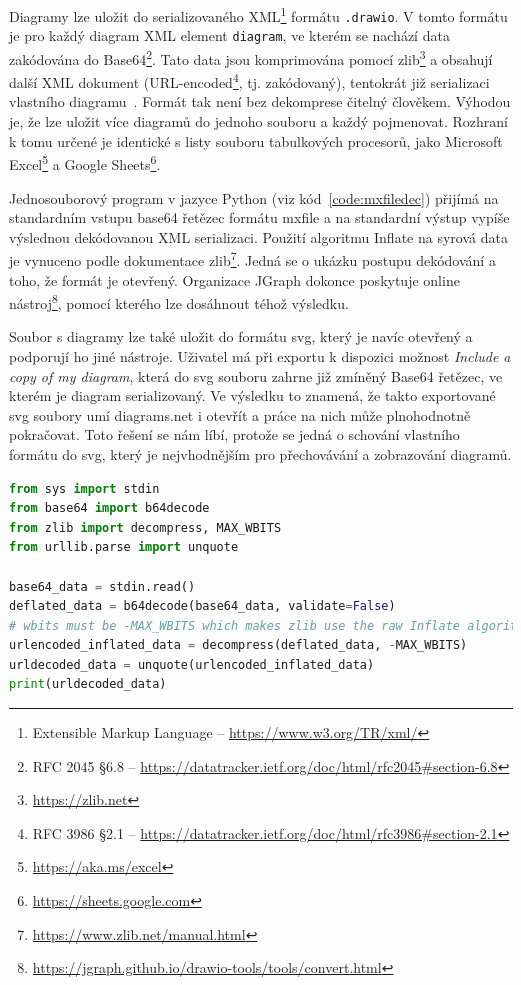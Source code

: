 Diagramy lze uložit do serializovaného XML\footnote{Extensible Markup Language -- \url{https://www.w3.org/TR/xml/}} formátu \texttt{.drawio}.
V tomto formátu je pro každý diagram XML element \texttt{diagram}, ve kterém se nachází data zakódována do Base64\footnote{RFC 2045 \S6.8 -- \url{https://datatracker.ietf.org/doc/html/rfc2045\#section-6.8}}.
Tato data jsou komprimována pomocí zlib\footnote{\url{https://zlib.net}} a obsahují další XML dokument (URL-encoded\footnote{RFC 3986 \S2.1 -- \url{https://datatracker.ietf.org/doc/html/rfc3986\#section-2.1}}, tj. zakódovaný), tentokrát již serializaci vlastního diagramu~\cite{seibert_extractingxml_2016}.
Formát tak není bez dekomprese čitelný člověkem.
Výhodou je, že lze uložit více diagramů do jednoho souboru a každý pojmenovat.
Rozhraní k tomu určené je identické s listy souboru tabulkových procesorů, jako Microsoft Excel\footnote{\url{https://aka.ms/excel}} a Google Sheets\footnote{\url{https://sheets.google.com}}.

Jednosouborový program v jazyce Python (viz kód~\ref{code:mxfiledec}) přijímá na standardním vstupu base64 řetězec formátu mxfile a na standardní výstup vypíše výslednou dekódovanou XML serializaci.
Použití algoritmu Inflate na syrová data je vynuceno podle dokumentace zlib\footnote{\url{https://www.zlib.net/manual.html}}.
Jedná se o ukázku postupu dekódování a toho, že formát je otevřený.
Organizace JGraph dokonce poskytuje online nástroj\footnote{\url{https://jgraph.github.io/drawio-tools/tools/convert.html}}, pomocí kterého lze dosáhnout téhož výsledku.

Soubor s diagramy lze také uložit do formátu \acrshort{svg}, který je navíc otevřený a podporují ho jiné nástroje.
Uživatel má při exportu k dispozici možnost \textit{Include a copy of my diagram}, která do \acrshort{svg} souboru zahrne již zmíněný Base64 řetězec, ve kterém je diagram serializovaný.
Ve výsledku to znamená, že takto exportované \acrshort{svg} soubory umí diagrams.net i otevřít a práce na nich může plnohodnotně pokračovat.
Toto řešení se nám líbí, protože se jedná o schování vlastního formátu do \acrshort{svg}, který je nejvhodnějším pro přechovávání a zobrazování diagramů.

\begin{lstlisting}[language=Python, caption=Dekódování mxfile, label=code:mxfiledec, float=htb]
from sys import stdin
from base64 import b64decode
from zlib import decompress, MAX_WBITS
from urllib.parse import unquote

base64_data = stdin.read()
deflated_data = b64decode(base64_data, validate=False)
# wbits must be -MAX_WBITS which makes zlib use the raw Inflate algorithm without header detection
urlencoded_inflated_data = decompress(deflated_data, -MAX_WBITS)
urldecoded_data = unquote(urlencoded_inflated_data)
print(urldecoded_data)
\end{lstlisting}

